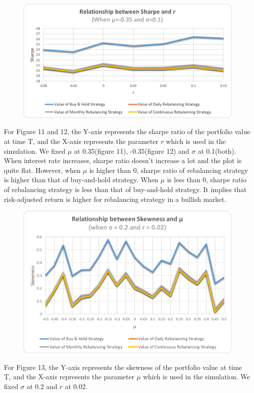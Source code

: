 \documentclass[
10pt, %
a4paper, %
oneside, %
headinclude,footinclude, %
BCOR5mm, %
]{scrartcl}
\begin{document}
\begin{figure}[H]
	\centering
	\includegraphics[width=0.7\linewidth]{sharpe_r_-035_010}
	\caption{}
	\label{fig:sharper-035010}
\end{figure}
For Figure 11 and 12, the Y-axis represents the sharpe ratio of the portfolio value at time T, and the X-axis represents the parameter $r$ which is used in the simulation. We fixed $\mu$ at 0.35(figure 11), -0.35(figure 12) and $\sigma$ at 0.1(both).\\

{\tiny When interest rate increases, sharpe ratio doesn’t increase a lot and the plot is quite flat. However,  when $\mu$ is higher than 0, sharpe ratio of rebalancing strategy is higher than that of buy-and-hold strategy. When $\mu$ is less than 0, sharpe ratio of rebalancing strategy is less than that of buy-and-hold strategy. It implies that risk-adjusted return is higher for rebalancing strategy in a bullish market. }\\

\begin{figure}[H]
	\centering
	\includegraphics[width=0.7\linewidth]{skew_mu_020_002}
	\caption{}
	\label{fig:skewmu020002}
\end{figure}
For Figure 13, the Y-axis represents the skewness of the portfolio value at time T, and the X-axis represents the parameter $\mu$ which is used in the simulation. We fixed $\sigma$ at 0.2 and $r$ at 0.02.\\
\end{document}
